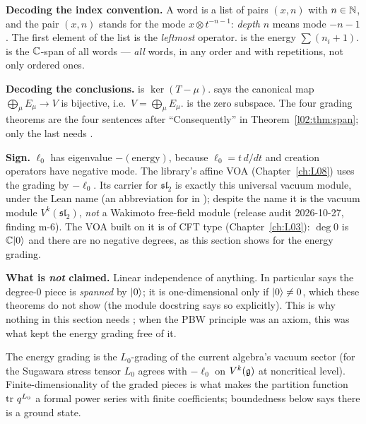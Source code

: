 \begin{dictionary}
\textbf{Decoding the index convention.} A word is a list of pairs $(x,n)$ with $n\in{\mathbb{N}}$, and the
pair $(x,n)$ stands for the mode $x\otimes t^{-n-1}$: \emph{depth} $n$ means mode $-n-1$. The first
element of the list is the \emph{leftmost} operator.  is the energy
$\sum(n_i+1)$.  is the ${\mathbb{C}}$-span of all words --- \emph{all} words, in any order and with
repetitions, not only ordered ones.

\textbf{Decoding the conclusions.}  is $\ker(T-\mu)$.
 says the canonical map $\bigoplus_\mu E_\mu\to V$ is
bijective, i.e.\ $V = \bigoplus_\mu E_\mu$.  is the zero subspace. The four grading
theorems are the four sentences after ``Consequently'' in Theorem~\ref{l02:thm:span}; only the last
needs \lean{[FiniteDimensional ℂ 𝔤]}.

\textbf{Sign.} $\ell_0$ has eigenvalue $-(\text{energy})$, because $\ell_0 = t\,d/dt$ and creation
operators have negative mode. The library's affine VOA (Chapter~\ref{ch:L08}) uses the grading by
$-\ell_0$. Its carrier for $\mathfrak{sl}_2$ is exactly this universal vacuum module, under the Lean name
 (an abbreviation for  in ); despite the name it is the vacuum module
$V^k(\mathfrak{sl}_2)$, \emph{not} a Wakimoto free-field module (release audit 2026-10-27, finding m-6). The VOA built on it is
of CFT type (Chapter~\ref{ch:L03}): $\deg 0$ is ${\mathbb{C}}|0\rangle$ and there are no negative degrees, as this section shows for
the energy grading.

\textbf{What is \emph{not} claimed.} Linear independence of anything. In particular
\allowbreak{} says the degree-$0$ piece is \emph{spanned} by $|0\rangle$; it is
one-dimensional only if $|0\rangle\ne0$, which these theorems do not show (the module docstring says so
explicitly). This is why nothing in this section needs ; when the PBW principle was
an axiom, this was what kept the energy grading free of it.
\end{dictionary}

\begin{physics}
The energy grading is the $L_0$-grading of the current algebra's vacuum sector (for the Sugawara
stress tensor $L_0$ agrees with $-\ell_0$ on $V^k(\mathfrak{g})$ at noncritical level). Finite-dimensionality
of the graded pieces is what makes the partition function $\operatorname{tr}\,q^{L_0}$ a formal power series with
finite coefficients; boundedness below says there is a ground state.
\end{physics}

